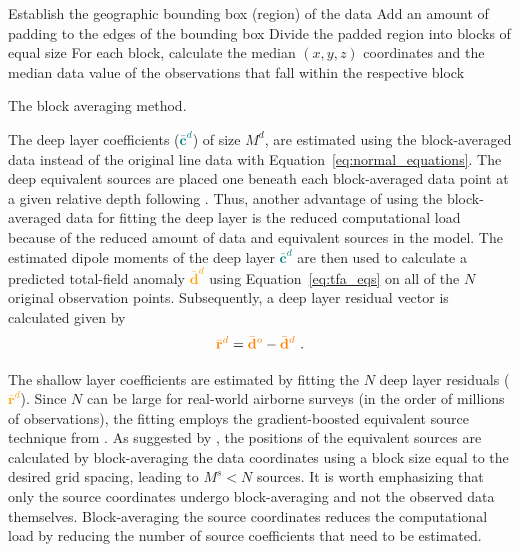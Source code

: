 \begin{algorithm}[!h]
  Establish the geographic bounding box (region) of the data
  \;
  Add an amount of padding to the edges of the bounding box
  \;
  Divide the padded region into blocks of equal size
  \;
  For each block, calculate the median $(x, y, z)$ coordinates and the median data value of the observations that fall within the respective block
  \;
  \BlankLine
  \caption{The block averaging method.}
  \label{alg:block_averaging}
\end{algorithm}


The deep layer coefficients (\textcolor{teal}{$\bar{\mathbf{c}}^d$}) of size $M^d$, are estimated using the block-averaged data instead of the original line data with Equation~\ref{eq:normal_equations}. The deep equivalent sources are placed one beneath each block-averaged data point at a given relative depth following \citet{Soler2021}. Thus, another advantage of using the block-averaged data for fitting the deep layer is the reduced computational load because of the reduced amount of data and equivalent sources in the model. The estimated dipole moments of the deep layer \textcolor{teal}{$\bar{\mathbf{c}}^d$} are then used to calculate a predicted total-field anomaly \textcolor{orange}{$\bar{\mathbf{d}}^d$} using Equation~\ref{eq:tfa_eqs} on all of the $N$ original observation points.
Subsequently, a deep layer residual vector is calculated given by
\begin{equation}
    \textcolor{orange}{\bar{\mathbf{r}}^d} = \textcolor{orange}{\bar{\mathbf{d}}^o} - \textcolor{orange}{\bar{\mathbf{d}}^d}
    \ .
    \label{eq:deep_residual}
\end{equation}

The shallow layer coefficients are estimated by fitting the $N$ deep layer residuals (\textcolor{orange}{$\bar{\mathbf{r}}^d$}). Since $N$ can be large for real-world airborne surveys (in the order of millions of observations), the fitting employs the gradient-boosted equivalent source technique from \citet{Soler2021}. As suggested by \citet{Soler2021}, the positions of the equivalent sources are calculated by block-averaging the data coordinates using a block size equal to the desired grid spacing, leading to $M^s < N$ sources. It is worth emphasizing that only the source coordinates undergo block-averaging and not the observed data themselves. Block-averaging the source coordinates reduces the computational load by reducing the number of source coefficients that need to be estimated.

